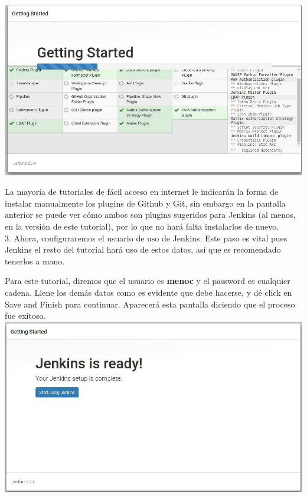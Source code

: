 \documentclass[a4paper]{article}
\newcommand\tab[1][0.55cm]{\hspace*{#1}}
\begin{document}
{\centering
	\includegraphics[scale=0.5]{progjenkins}
\justify
  
\tab La mayoría de tutoriales de fácil acceso en internet le indicarán la forma de instalar manualmente los plugins de Github y Git, sin embargo en la pantalla anterior se puede ver cómo ambos son plugins sugeridos para Jenkins (al menos, en la versión de este tutorial), por lo que no hará falta instalarlos de nuevo. \\

3. Ahora, configuraremos el usuario de uso de Jenkins. Este paso es vital pues Jenkins el resto del tutorial hará uso de estos datos, así que es recomendado tenerlos a mano. 

Para este tutorial, diremos que el usuario es \textbf{menoc} y el password es cualquier cadena. Llene los demás datos como es evidente que debe hacerse, y dé click en Save and Finish para continuar. Aparecerá esta pantalla diciendo que el proceso fue exitoso. \\

\centering
	\includegraphics[scale=0.5]{jenkinsready}
\justify

}
\end{document}
